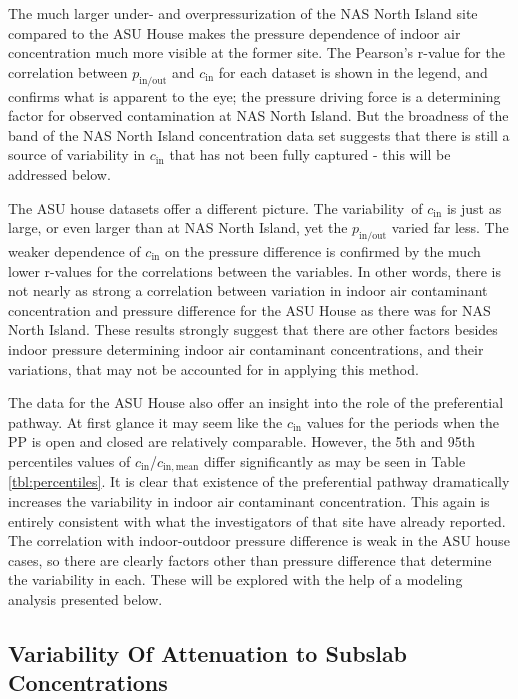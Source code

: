\documentclass[journal=esthag,manuscript=article]{achemso}
\begin{document}
The much larger under- and overpressurization of the NAS North Island site compared to the ASU House makes the pressure dependence of indoor air concentration much more visible at the former site.
The Pearson’s r-value for the correlation between $p_\mathrm{in/out}$ and $c_\mathrm{in}$ for each dataset is shown in the legend, and confirms what is apparent to the eye; the pressure driving force is a determining factor for observed contamination at NAS North Island.
But the broadness of the band of the NAS North Island concentration data set suggests that there is still a source of variability in $c_\mathrm{in}$ that has not been fully captured - this will be addressed below.\par

The ASU house datasets offer a different picture.
The variability of $c_\mathrm{in}$ is just as large, or even larger than at NAS North Island, yet the $p_\mathrm{in/out}$ varied far less.
The weaker dependence of $c_\mathrm{in}$ on the pressure difference is confirmed by the much lower r-values for the correlations between the variables.
In other words, there is not nearly as strong a correlation between variation in indoor air contaminant concentration and pressure difference for the ASU House as there was for NAS North Island.
These results strongly suggest that there are other factors besides indoor pressure determining indoor air contaminant concentrations, and their variations, that may not be accounted for in applying this method.\par

The data for the ASU House also offer an insight into the role of the preferential pathway.
At first glance it may seem like the $c_\mathrm{in}$ values for the periods when the PP is open and closed are relatively comparable.
However, the 5th and 95th percentiles values of $c_\mathrm{in}$/$c_\mathrm{in,mean}$ differ significantly as may be seen in Table \ref{tbl:percentiles}.
It is clear that existence of the preferential pathway dramatically increases the variability in indoor air contaminant concentration.
This again is entirely consistent with what the investigators of that site have already reported\cite{guo_identification_2015}.
The correlation with indoor-outdoor pressure difference is weak in the ASU house cases, so there are clearly factors other than pressure difference that determine the variability in each.
These will be explored with the help of a modeling analysis presented below.\par

\subsection{Variability Of Attenuation to Subslab Concentrations}
\end{document}
